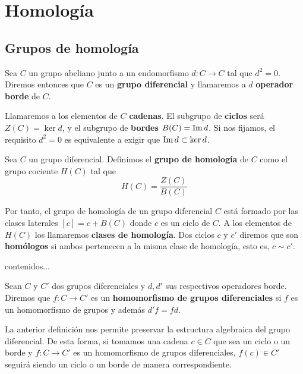
\chapter{Homología}

\section{Grupos de homología}

\begin{definicion}
	Sea $C$ un grupo abeliano junto a un endomorfismo  $d: C \rightarrow C$ tal que $d^2 = 0$. Diremos entonces que $C$ es un \textbf{grupo diferencial} y llamaremos a $d$ \textbf{operador borde} de $C$.
\end{definicion}

Llamaremos a los elementos de $C$ \textbf{cadenas}. El subgrupo de \textbf{ciclos} será $Z(C) = \ker d$,  y el subgrupo de \textbf{bordes} $B(C) = \operatorname{Im} d$. Si nos fijamos, el requisito $d^2 = 0$ es equivalente a exigir que $\operatorname{Im}{d} \subset \ker{d}$.

\begin{definicion}
	Sea $C$ un grupo diferencial. Definimos el \textbf{grupo de homología} de $C$ como el grupo cociente $H(C)$ tal que 
	\[ H(C) = \frac{Z(C)}{B(C)}\]
\end{definicion}

Por tanto, el grupo de homología de un grupo diferencial $C$ está formado por las clases laterales $[c] = c + B(C)$ donde $c$ es un ciclo de $C$. A los elementos de $H(C)$ los llamaremos \textbf{clases de homología}. Dos ciclos $c$ y $c'$ diremos que son \textbf{homólogos} si ambos pertenecen a la misma clase de homología, esto es, $c \sim c'$.

\begin{ejemplo}
	contenidos...
\end{ejemplo}

\begin{definicion}
	Sean $C$ y $C'$ dos grupos diferenciales y $d, d'$ sus respectivos operadores borde. Diremos que $f: C \rightarrow C'$ es un \textbf{homomorfismo de grupos diferenciales} si $f$ es un homomorfismo de grupos y además $d'f = fd$.
\end{definicion}

La anterior definición nos permite preservar la estructura algebraica del grupo diferencial. De esta forma, si tomamos una cadena $c \in C$ que sea un ciclo o un borde y $f:C \rightarrow C'$ es un homomorfismo de grupos diferenciales, $f(c) \in C'$ seguirá siendo un ciclo o un borde de manera correspondiente.

